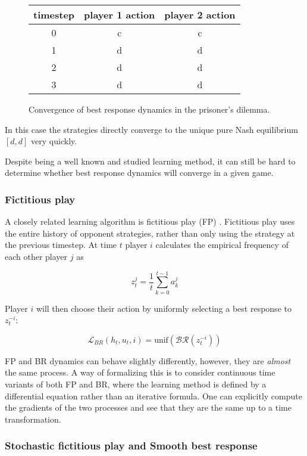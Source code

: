 \begin{figure}
\begin{center}
 \begin{tabular}{||c c c||} 
 \hline
 timestep & player 1 action & player 2 action \\ [0.5ex] 
 \hline\hline
 0 & c & c \\ 
 \hline
 1 & d & d \\ 
 \hline
 2 & d & d \\
 \hline
 3 & d & d \\
 \hline
\end{tabular}
\end{center}
    \caption{Convergence of best response dynamics in the prisoner's dilemma.}
    \label{fig:pddynamics}
\end{figure}

In this case the strategies directly converge to the unique pure Nash equilibrium $\left[ d, d \right]$ very quickly. 

Despite being a well known and studied learning method, it can still be hard to determine whether best response dynamics will converge in a given game.

\subsubsection{Fictitious play}
A closely related learning algorithm is fictitious play (FP) \cite{brown1951iterative}. Fictitious play uses the entire history of opponent strategies, rather than only using the strategy at the previous timestep. At time $t$ player $i$ calculates the empirical frequency of each other player $j$ as

$$
z_t^j = \dfrac{1}{t} \sum_{k=0}^{t-1} a_k^j
$$

Player $i$ will then choose their action by uniformly selecting a best response to $z_t^{-i}$:

$$
\mathcal{L}_{BR}(h_t, u_t, i) = \text{unif}\left(\mathcal{BR}(z^{-i}_{t})\right)
$$

FP and BR dynamics can behave slightly differently, however, they are {\em almost} the same process. A way of formalizing this is to consider continuous time variants of both FP and BR, where the learning method is defined by a differential equation rather than an iterative formula. One can explicitly compute the gradients of the two processes and see that they are the same up to a time transformation. 


\subsubsection{Stochastic fictitious play and Smooth best response}

